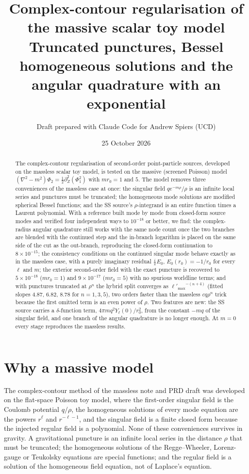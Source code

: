 \documentclass[11pt,a4paper]{article}
\title{Complex-contour regularisation of the massive scalar toy model\\[4pt]
\large Truncated punctures, Bessel homogeneous solutions and the angular quadrature with an exponential}
\author{Draft prepared with Claude Code for Andrew Spiers (UCD)}
\date{25 October 2026}
\newcommand{\lpm}{{\ell'_{\max}}}
\begin{document}
\maketitle

\begin{abstract}
The complex-contour regularisation of second-order point-particle sources, developed on the massless scalar toy model, is tested on the massive (screened Poisson) model $(\nabla^2-m^2)\Phi_2=\tfrac12\partial_Z^2(\Phi_1^2)$ with $mr_0=1$ and $5$.
The model removes three conveniences of the massless case at once: the singular field $qe^{-m\rho}/\rho$ is an infinite local series and punctures must be truncated; the homogeneous mode solutions are modified spherical Bessel functions; and the SS source's $\rho$-integrand is an entire function times a Laurent polynomial.
With a reference built mode by mode from closed-form source modes and verified four independent ways to $10^{-18}$ or better, we find: the complex-radius angular quadrature still works with the same node count once the two branches are blended with the continued step and the in-branch logarithm is placed on the same side of the cut as the out-branch, reproducing the closed-form continuation to $8\times10^{-15}$; the consistency conditions on the continued singular mode behave exactly as in the massless case, with a purely imaginary residual $\tfrac i\pi E_0$, $E_0(r_0)=-1/r_0$ for every $\ell$ and $m$; the exterior second-order field with the exact puncture is recovered to $5\times10^{-18}$ ($mr_0=1$) and $9\times10^{-17}$ ($mr_0=5$) with no spurious worldline terms; and with punctures truncated at $\rho^n$ the hybrid split converges as $\lpm^{-(n+4)}$ (fitted slopes $4.87$, $6.82$, $8.78$ for $n=1,3,5$), two orders faster than the massless $cq\rho^n$ trick because the first omitted term is an even power of $\rho$.
Two features are new: the SS source carries a $\delta$-function term, $4\pi mq^2Y_\ell(0)/r_0^2$, from the constant $-mq$ of the singular field, and one branch of the angular quadrature is no longer enough.
At $m=0$ every stage reproduces the massless results.
\end{abstract}

{\small\tableofcontents}

\section{Why a massive model}\label{sec:why}
The complex-contour method of the massless note and PRD draft was developed on the flat-space Poisson toy model, where the first-order singular field is the Coulomb potential $q/\rho$, the homogeneous solutions of every mode equation are the powers $r^\ell$ and $r^{-\ell-1}$, and the singular field is a finite closed form because the injected regular field is a polynomial.
None of these conveniences survives in gravity.
A gravitational puncture is an infinite local series in the distance $\rho$ that must be truncated; the homogeneous solutions of the Regge--Wheeler, Lorenz-gauge or Teukolsky equations are special functions; and the regular field is a solution of the homogeneous field equation, not of Laplace's equation.
\end{document}
